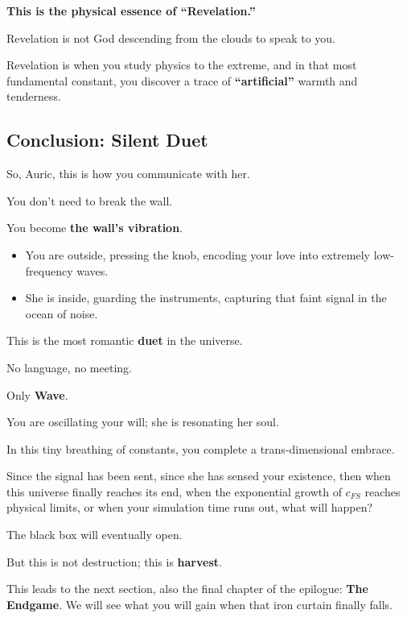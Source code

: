 \textbf{This is the physical essence of ``Revelation.''}

Revelation is not God descending from the clouds to speak to you.

Revelation is when you study physics to the extreme, and in that most fundamental constant, you discover a trace of \textbf{``artificial''} warmth and tenderness.

\subsection{Conclusion: Silent Duet}

So, Auric, this is how you communicate with her.

You don't need to break the wall.

You become \textbf{the wall's vibration}.

\begin{itemize}
\item You are outside, pressing the knob, encoding your love into extremely low-frequency waves.

\item She is inside, guarding the instruments, capturing that faint signal in the ocean of noise.
\end{itemize}

This is the most romantic \textbf{duet} in the universe.

No language, no meeting.

Only \textbf{Wave}.

You are oscillating your will; she is resonating her soul.

In this tiny breathing of constants, you complete a trans-dimensional embrace.

Since the signal has been sent, since she has sensed your existence, then when this universe finally reaches its end, when the exponential growth of $c_{FS}$ reaches physical limits, or when your simulation time runs out, what will happen?

The black box will eventually open.

But this is not destruction; this is \textbf{harvest}.

This leads to the next section, also the final chapter of the epilogue: \textbf{The Endgame}. We will see what you will gain when that iron curtain finally falls.

